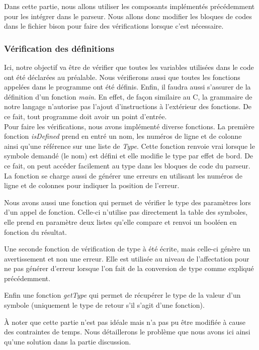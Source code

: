 \documentclass[a4paper]{article}%
\begin{document}
Dans cette partie, nous allons utiliser les composants implémentés précédemment
pour les intégrer dans le parseur. Nous allons donc modifier les bloques de
codes dans le fichier bison pour faire des vérifications lorsque c'est
nécessaire.

\subsubsection*{Vérification des définitions}

Ici, notre objectif va être de vérifier que toutes les variables utilisées dans
le code ont été déclarées au préalable. Nous vérifierons aussi que toutes les
fonctions appelées dans le programme ont été définis. Enfin, il faudra aussi
s'assurer de la définition d'un fonction \textit{main}. En effet, de façon
similaire au C, la grammaire de notre langage n'autorise pas l'ajout
d'instructions à l'extérieur des fonctions. De ce fait, tout programme doit
avoir un point d'entrée.\\

Pour faire les vérifications, nous avons implémenté diverse fonctions. La
première fonction \textit{isDefined} prend en entré un nom, les numéros de
ligne et de colonne ainsi qu'une référence sur une liste de \textit{Type}.
Cette fonction renvoie vrai lorsque le symbole demandé (le nom) est défini et
elle modifie le type par effet de bord. De ce fait, on peut accéder facilement
au type dans les bloques de code du parseur. La fonction se charge aussi
de générer une erreurs en utilisant les numéros de ligne et de colonnes pour
indiquer la position de l'erreur.

Nous avons aussi une fonction qui permet de vérifier le type des paramètres lors
d'un appel de fonction. Celle-ci n'utilise pas directement la table des
symboles, elle prend en paramètre deux listes qu'elle compare et renvoi un
booléen en fonction du résultat.

Une seconde fonction de vérification de type à été écrite, mais celle-ci génère
un avertissement et non une erreur. Elle est utilisée au niveau de l'affectation pour
ne pas générer d'erreur lorsque l'on fait de la conversion de type comme
expliqué précédemment.

Enfin une fonction \textit{getType} qui permet de récupérer le type de la valeur
d'un symbole (uniquement le type de retour s'il s'agit d'une fonction).

À noter que cette partie n'est pas idéale mais n'a pas pu être modifiée à cause
des contraintes de temps. Nous détaillerons le problème que nous avons ici ainsi
qu'une solution dans la partie discussion.\\
\end{document}
